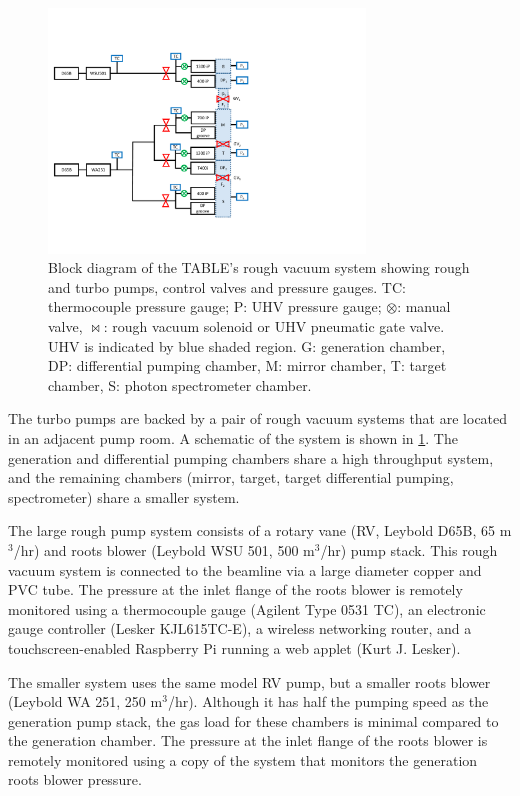\begin{figure}
	\centering
	\includegraphics[width=0.75\textwidth]{figures/chap2/rough_vacuum_schematic.pdf}
	\caption{Block diagram of the TABLE's rough vacuum system showing rough and turbo pumps, control valves and pressure gauges. TC: thermocouple pressure gauge; P: UHV pressure gauge; $\otimes$: manual valve, $\bowtie$: rough vacuum solenoid or UHV pneumatic gate valve. UHV is indicated by blue shaded region. G: generation chamber, DP: differential pumping chamber, M: mirror chamber, T: target chamber, S: photon spectrometer chamber.}
	\label{fig:rough_vacuum_schematic}
\end{figure}

The turbo pumps are backed by a pair of rough vacuum systems that are located in an adjacent pump room. A schematic of the system is shown in \cref{fig:rough_vacuum_schematic}. The generation and differential pumping chambers share a high throughput system, and the remaining chambers (mirror, target, target differential pumping, spectrometer) share a smaller system.

The large rough pump system consists of a rotary vane (RV, Leybold D65B, 65 m$^3$/hr) and roots blower (Leybold WSU 501, 500 m$^3$/hr) pump stack. This rough vacuum system is connected to the beamline via a large diameter copper and PVC tube. The pressure at the inlet flange of the roots blower is remotely monitored using a thermocouple gauge (Agilent Type 0531 TC), an electronic gauge controller (Lesker KJL615TC-E), a wireless networking router, and a touchscreen-enabled Raspberry Pi running a web applet (Kurt J. Lesker).

The smaller system uses the same model RV pump, but a smaller roots blower (Leybold WA 251, 250 m$^3$/hr). Although it has half the pumping speed as the generation pump stack, the gas load for these chambers is minimal compared to the generation chamber. The pressure at the inlet flange of the roots blower is remotely monitored using a copy of the system that monitors the generation roots blower pressure.

